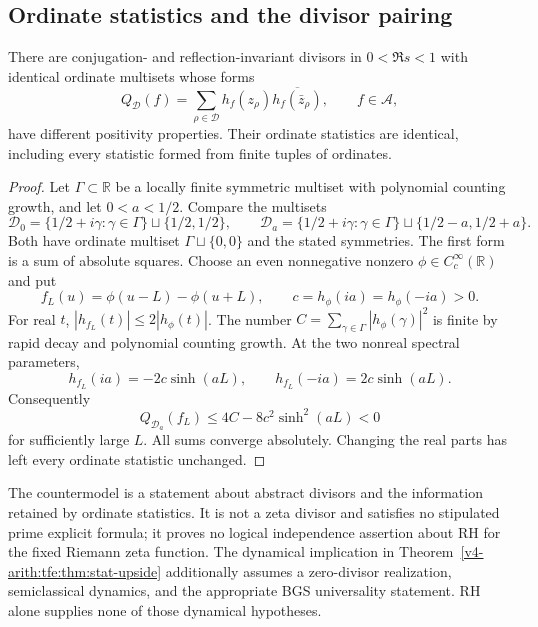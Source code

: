 \subsection{Ordinate statistics and the divisor pairing}
\label{v4-arith:w8-atp:negative:BGS}

\begin{theorem}
\label{v4-arith:w8-atp:thm:BGS-consequent}
There are conjugation- and reflection-invariant divisors in
$0<\Re s<1$ with identical ordinate multisets whose forms
\[
 Q_{\mathcal D}(f)=
 \sum_{\rho\in\mathcal D}
 h_f(z_\rho)\overline{h_f(\bar z_\rho)},
 \qquad f\in\mathscr A,
\]
have different positivity properties. Their ordinate statistics
are identical, including every statistic formed from finite
tuples of ordinates.
\end{theorem}
\begin{proof}
Let $\Gamma\subset\mathbb R$ be a locally finite symmetric
multiset with polynomial counting growth, and let $0<a<1/2$.
Compare the multisets
\[
 \mathcal D_0=\{1/2+i\gamma:\gamma\in\Gamma\}
                 \sqcup\{1/2,1/2\},\qquad
 \mathcal D_a=\{1/2+i\gamma:\gamma\in\Gamma\}
                 \sqcup\{1/2-a,1/2+a\}.
\]
Both have ordinate multiset $\Gamma\sqcup\{0,0\}$ and
the stated symmetries. The first form is a sum of absolute
squares. Choose an even nonnegative nonzero
$\phi\in C_c^\infty(\mathbb R)$ and put
\[
 f_L(u)=\phi(u-L)-\phi(u+L),\qquad
 c=h_\phi(ia)=h_\phi(-ia)>0.
\]
For real $t$, $|h_{f_L}(t)|\leq2|h_\phi(t)|$.
The number $C=\sum_{\gamma\in\Gamma}|h_\phi(\gamma)|^2$
is finite by rapid decay and polynomial counting growth.
At the two nonreal spectral parameters,
\[
 h_{f_L}(ia)=-2c\sinh(aL),\qquad
 h_{f_L}(-ia)=2c\sinh(aL).
\]
Consequently
\[
 Q_{\mathcal D_a}(f_L)
 \leq4C-8c^2\sinh^2(aL)<0
\]
for sufficiently large $L$. All sums converge absolutely.
Changing the real parts has left every ordinate statistic
unchanged.
\end{proof}

\begin{remark}
\label{v4-arith:w8-atp:rem:statistical-upside-unchanged}
The countermodel is a statement about abstract divisors and
the information retained by ordinate statistics. It is not
a zeta divisor and satisfies no stipulated prime explicit
formula; it proves no logical independence assertion about
RH for the fixed Riemann zeta function.
The dynamical implication in
Theorem~\ref{v4-arith:tfe:thm:stat-upside} additionally assumes a
zero-divisor realization, semiclassical dynamics, and the
appropriate BGS universality statement. RH alone supplies
none of those dynamical hypotheses.
\end{remark}
